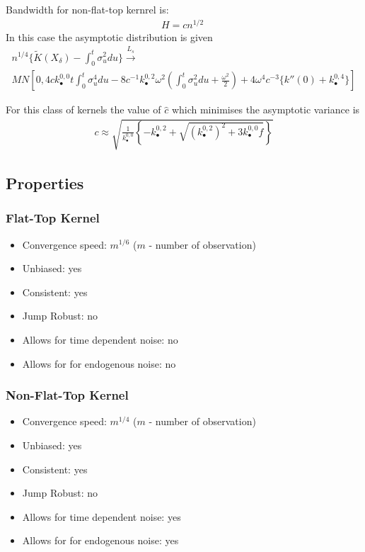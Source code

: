 \documentclass[letterpaper]{report}
\newcounter{N}
\begin{document}
\noindent Bandwidth for non-flat-top kernrel is:
\begin{gather}
H = cn^{1/2}\;
\end{gather}
\noindent In this case the asymptotic distribution is given
\begin{gather}
n^{1/4}\{\tilde{K}(X_\delta) - \int_0^t \sigma_u^2 du\}
\stackrel{L_s}{\to}\nonumber\\
MN\left[0,4c k_{\bullet}^{0,0} t \int_0^t \sigma_u^4 du - 8 c^{-1} k_{\bullet}^{0,2}\omega^2 \left(\int_0^t \sigma_u^2 du + \frac{\omega^2}{2}\right) + 4\omega^4c^{-3}\{k''(0) + k_{\bullet}^{0,4}\} \right]
\end{gather}

\noindent For this class of kernels the value of $\hat{c}$ which minimises the asymptotic variance is
\begin{gather}
c \approx \sqrt{\frac{1}{k_{\bullet}^{0,0}} \left\{-k_{\bullet}^{0,2} + \sqrt{(k_{\bullet}^{0,2})^2 + 3 k_{\bullet}^{0,0} f} \right\}}
\end{gather}
\subsection{Properties}
\subsubsection{Flat-Top Kernel}
\begin{itemize}
\item Convergence speed: $m^{1/6}$ ($m$ - number of observation)
\item Unbiased: yes
\item Consistent: yes
\item Jump Robust: no
\item Allows for time dependent noise: no
\item Allows for for endogenous noise: no
\end{itemize}
\subsubsection{Non-Flat-Top Kernel}
\begin{itemize}
\item Convergence speed: $m^{1/4}$ ($m$ - number of observation)
\item Unbiased: yes
\item Consistent: yes
\item Jump Robust: no
\item Allows for time dependent noise: yes
\item Allows for for endogenous noise: yes
\end{itemize}
\end{document}
